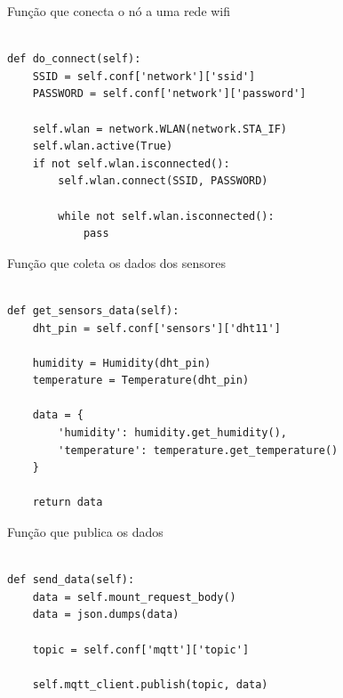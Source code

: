 \begin{table}[H]
\centering
\caption{Função que conecta o nó a uma rede wifi}
\vspace{-\baselineskip}
\begin{verbatim}

def do_connect(self):
    SSID = self.conf['network']['ssid']
    PASSWORD = self.conf['network']['password']

    self.wlan = network.WLAN(network.STA_IF)
    self.wlan.active(True)
    if not self.wlan.isconnected():
        self.wlan.connect(SSID, PASSWORD)

        while not self.wlan.isconnected():
            pass

\end{verbatim}
\vspace{-1.2cm}
\label{tab:funcao-conecta}
\end{table}

\begin{table}[H]
\centering
\caption{Função que coleta os dados dos sensores}
\vspace{-\baselineskip}
\begin{verbatim}

def get_sensors_data(self):
    dht_pin = self.conf['sensors']['dht11']

    humidity = Humidity(dht_pin)
    temperature = Temperature(dht_pin)

    data = {
        'humidity': humidity.get_humidity(),
        'temperature': temperature.get_temperature()
    }

    return data

\end{verbatim}
\vspace{-1.2cm}
\label{tab:funcao-coleta}
\end{table}

\begin{table}[H]
\centering
\caption{Função que publica os dados}
\vspace{-\baselineskip}
\begin{verbatim}

def send_data(self):
    data = self.mount_request_body()
    data = json.dumps(data)
    
    topic = self.conf['mqtt']['topic']

    self.mqtt_client.publish(topic, data)

\end{verbatim}
\vspace{-1.2cm}
\label{tab:funcao-publica}
\end{table}

